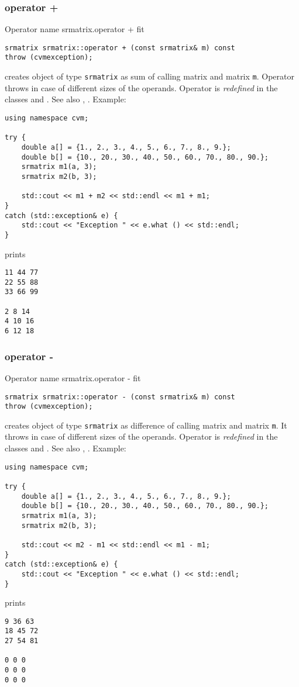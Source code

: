 \subsubsection{operator +}
Operator%
\pdfdest name {srmatrix.operator +} fit
\begin{verbatim}
srmatrix srmatrix::operator + (const srmatrix& m) const
throw (cvmexception);
\end{verbatim}
creates  object of type \verb"srmatrix" as  sum of
 calling matrix and  matrix \verb"m".
Operator throws  
in case of different sizes of the operands.
Operator is \emph{redefined} in the classes
and .
See also , .
Example:
\begin{Verbatim}
using namespace cvm;

try {
    double a[] = {1., 2., 3., 4., 5., 6., 7., 8., 9.};
    double b[] = {10., 20., 30., 40., 50., 60., 70., 80., 90.};
    srmatrix m1(a, 3);
    srmatrix m2(b, 3);

    std::cout << m1 + m2 << std::endl << m1 + m1;
}
catch (std::exception& e) {
    std::cout << "Exception " << e.what () << std::endl;
}
\end{Verbatim}
prints
\begin{Verbatim}
11 44 77
22 55 88
33 66 99

2 8 14
4 10 16
6 12 18
\end{Verbatim}
\newpage




\subsubsection{operator -}
Operator%
\pdfdest name {srmatrix.operator -} fit
\begin{verbatim}
srmatrix srmatrix::operator - (const srmatrix& m) const
throw (cvmexception);
\end{verbatim}
creates  object of type \verb"srmatrix" as  difference of
 calling matrix and  matrix \verb"m".
It throws  
in case of different sizes of the operands.
Operator is \emph{redefined} in the classes
and .
See also , .
Example:
\begin{Verbatim}
using namespace cvm;

try {
    double a[] = {1., 2., 3., 4., 5., 6., 7., 8., 9.};
    double b[] = {10., 20., 30., 40., 50., 60., 70., 80., 90.};
    srmatrix m1(a, 3);
    srmatrix m2(b, 3);

    std::cout << m2 - m1 << std::endl << m1 - m1;
}
catch (std::exception& e) {
    std::cout << "Exception " << e.what () << std::endl;
}
\end{Verbatim}
prints
\begin{Verbatim}
9 36 63
18 45 72
27 54 81

0 0 0
0 0 0
0 0 0
\end{Verbatim}
\newpage


